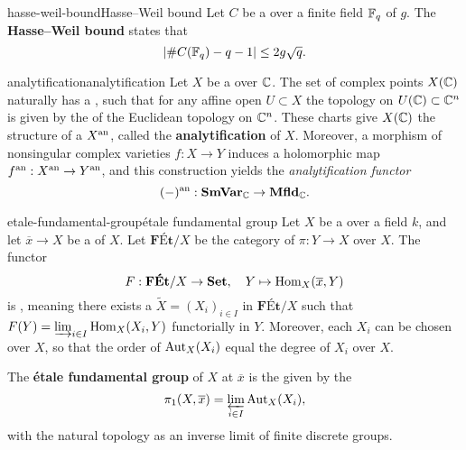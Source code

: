 \begin{topic}{hasse-weil-bound}{Hasse--Weil bound}
    Let $C$ be a    over a finite field $\mathbb{F}_q$ of  $g$. The \textbf{Hasse--Weil bound} states that
    \[ | \#C(\mathbb{F}_q) - q - 1 | \le 2 g \sqrt{q} . \]
\end{topic}

\begin{topic}{analytification}{analytification}
    Let $X$ be a   over $\mathbb{C}$. 
    The set of complex points $X(\mathbb{C})$ naturally has a , such that for any affine open $U \subset X$ the topology on $U(\mathbb{C}) \subset \mathbb{C}^n$ is given by the  of the Euclidean topology on $\mathbb{C}^n$. These charts give $X(\mathbb{C})$ the structure of a  $X^\textup{an}$, called the \textbf{analytification} of $X$. Moreover, a morphism of nonsingular complex varieties $f : X \to Y$ induces a holomorphic map $f^\textup{an} : X^\textup{an} \to Y^\textup{an}$, and this construction yields the \textit{analytification functor}
    \[ (-)^\textup{an} : \textbf{SmVar}_{\mathbb{C}} \to \textbf{Mfld}_{\mathbb{C}} . \]
\end{topic}

\begin{topic}{etale-fundamental-group}{étale fundamental group}
    Let $X$ be a  over a field $k$, and let $\overline{x} \to X$ be a  of $X$. Let $\textbf{FÉt}/X$ be the category of   $\pi : Y \to X$ over $X$. The functor
    \[ F : \textbf{FÉt}/X \to \textbf{Set}, \quad Y \mapsto \operatorname{Hom}_X(\overline{x}, Y) \]
    is , meaning there exists a  $\tilde{X} = (X_i)_{i \in I}$ in $\textbf{FÉt}/X$ such that $F(Y) = \varinjlim_{i \in I} \operatorname{Hom}_X(X_i, Y)$ functorially in $Y$. Moreover, each $X_i$ can be chosen  over $X$, so that the order of $\textup{Aut}_X(X_i)$ equal the degree of $X_i$ over $X$.
    
    The \textbf{étale fundamental group} of $X$ at $\overline{x}$ is the  given by the 
    \[ \pi_1(X, \overline{x}) = \varprojlim_{i \in I} \textup{Aut}_X(X_i) , \]
    with the natural topology as an inverse limit of finite discrete groups.
\end{topic}

